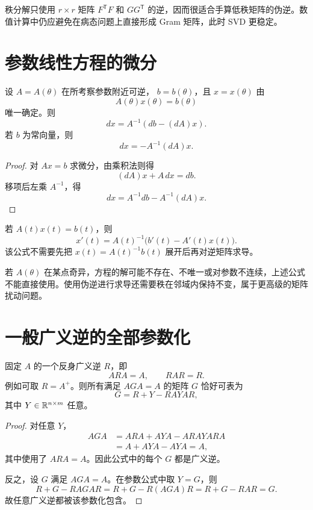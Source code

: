 \begin{remark}
秩分解只使用 $r\times r$ 矩阵
$F^{\mathsf T}F$ 和 $GG^{\mathsf T}$ 的逆，因而很适合手算低秩矩阵的伪逆。数值计算中仍应避免在病态问题上直接形成 Gram 矩阵，此时 SVD 更稳定。
\end{remark}

\section{参数线性方程的微分}

\begin{theorem}[隐式线性方程的微分]
设 $A=A(\theta)$ 在所考察参数附近可逆，
$b=b(\theta)$，且 $x=x(\theta)$ 由
\[
A(\theta)x(\theta)=b(\theta)
\]
唯一确定。则
\[
\boxed{dx=A^{-1}(db-(dA)x).}
\]
若 $b$ 为常向量，则
\[
dx=-A^{-1}(dA)x.
\]
\end{theorem}
\begin{proof}
对 $Ax=b$ 求微分，由乘积法则得
\[
(dA)x+A\,dx=db.
\]
移项后左乘 $A^{-1}$，得
\[
dx=A^{-1}db-A^{-1}(dA)x.
\]
\end{proof}

\begin{corollary}[具体参数的导数]
若 $A(t)x(t)=b(t)$，则
\[
x'(t)=A(t)^{-1}\bigl(b'(t)-A'(t)x(t)\bigr).
\]
该公式不需要先把 $x(t)=A(t)^{-1}b(t)$ 展开后再对逆矩阵求导。
\end{corollary}

\begin{pitfall}[可逆性是公式的关键条件]
若 $A(\theta)$ 在某点奇异，方程的解可能不存在、不唯一或对参数不连续，上述公式不能直接使用。使用伪逆进行求导还需要秩在邻域内保持不变，属于更高级的矩阵扰动问题。
\end{pitfall}

\section{一般广义逆的全部参数化}

\begin{theorem}[所有内逆的参数化]
固定 $A$ 的一个反身广义逆 $R$，即
\[
ARA=A,
\qquad
RAR=R.
\]
例如可取 $R=A^+$。则所有满足 $AGA=A$ 的矩阵 $G$ 恰好可表为
\[
\boxed{G=R+Y-RAYAR,}
\]
其中 $Y\in\mathbb{R}^{n\times m}$ 任意。
\end{theorem}
\begin{proof}
对任意 $Y$，
\begin{align*}
AGA
&=ARA+AYA-ARAYARA\\
&=A+AYA-AYA=A,
\end{align*}
其中使用了 $ARA=A$。因此公式中的每个 $G$ 都是广义逆。

反之，设 $G$ 满足 $AGA=A$。在参数公式中取 $Y=G$，则
\[
R+G-RAGAR
=R+G-R(AGA)R
=R+G-RAR=G.
\]
故任意广义逆都被该参数化包含。
\end{proof}

